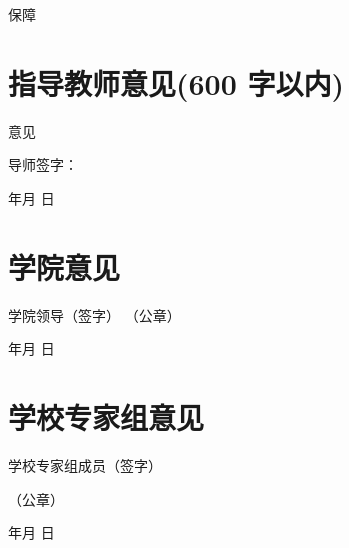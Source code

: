 \documentclass[a4paper,zihao=5,UTF8, twoside]{ctexart}
\begin{document}
保障

\section{指导教师意见(600 字以内)}

意见

\begin{flushright}
	导师签字： \hspace{6cm}

	年\qquad 月 \qquad 日\hspace{4cm}
\end{flushright}

\section{学院意见}

\vspace{5cm}

\begin{flushright}
	学院领导（签字） \hspace{5cm} （公章） \hspace{1cm}

	年\qquad 月 \qquad 日
\end{flushright}

\section{学校专家组意见}

\vspace{5cm}

\begin{flushright}
	学校专家组成员（签字） \hspace{7cm}

	（公章） \hspace{1cm}

	年\qquad 月 \qquad 日
\end{flushright}
\end{document}

